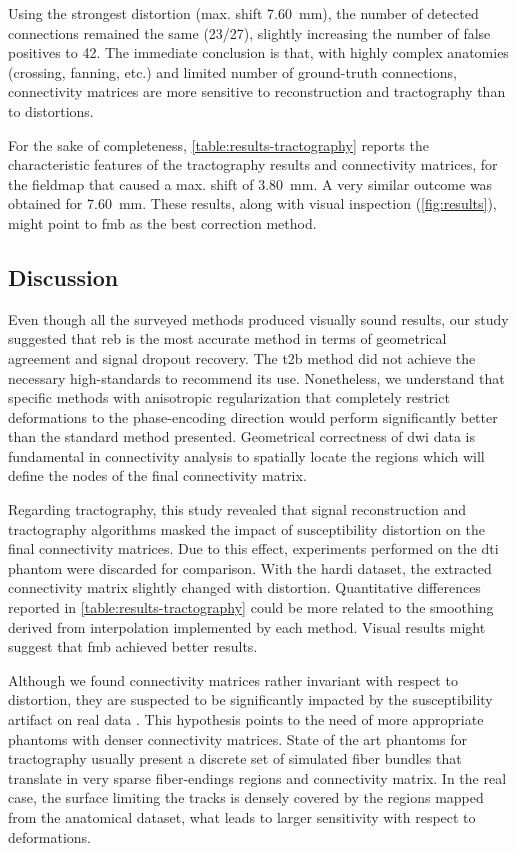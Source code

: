 Using the strongest distortion (max. shift 7.60~mm), the number of detected connections
  remained the same (23/27), slightly increasing the number of false positives to 42.
The immediate conclusion is that, with highly complex anatomies (crossing, fanning, etc.)
  and limited number of ground-truth connections, connectivity matrices are more sensitive
  to reconstruction and tractography than to distortions.

For the sake of completeness, \autoref{table:results-tractography} reports the characteristic
  features of the tractography results and connectivity matrices, for the fieldmap that caused a max.
  shift of 3.80~mm.
A very similar outcome was obtained for 7.60~mm.
These results, along with visual inspection (\autoref{fig:results}), might point to \gls*{fmb} as
  the best correction method.

\subsection{Discussion}\label{sec:discussion}
Even though all the surveyed methods produced visually sound results, our study suggested that
  \gls*{reb} is the most accurate method in terms of geometrical agreement and signal dropout recovery.
The \gls*{t2b} method did not achieve the necessary high-standards to recommend its use.
Nonetheless, we understand that specific methods with anisotropic regularization that completely
  restrict deformations to the phase-encoding direction would perform significantly better than
  the standard method presented.
Geometrical correctness of \gls*{dwi} data is fundamental in connectivity analysis to spatially
  locate the regions which will define the nodes of the final connectivity matrix.

Regarding tractography, this study revealed that signal reconstruction and tractography algorithms
  masked the impact of susceptibility distortion on the final connectivity matrices.
Due to this effect, experiments performed on the \gls*{dti} phantom were discarded for comparison.
With the \gls*{hardi} dataset, the extracted connectivity matrix slightly changed with distortion.
Quantitative differences reported in \autoref{table:results-tractography} could be more related to
  the smoothing derived from interpolation implemented by each method.
Visual results might suggest that \gls*{fmb} achieved better results.

Although we found connectivity matrices rather invariant with respect to distortion, they are suspected
  to be significantly impacted by the susceptibility artifact on real data \cite{irfanoglu_effects_2012}.
This hypothesis points to the need of more appropriate phantoms with denser connectivity matrices.
State of the art phantoms for tractography usually present a discrete set of simulated fiber bundles that
  translate in very sparse fiber-endings regions and connectivity matrix.
In the real case, the surface limiting the tracks is densely covered by the regions mapped from the anatomical
  dataset, what leads to larger sensitivity with respect to deformations.

